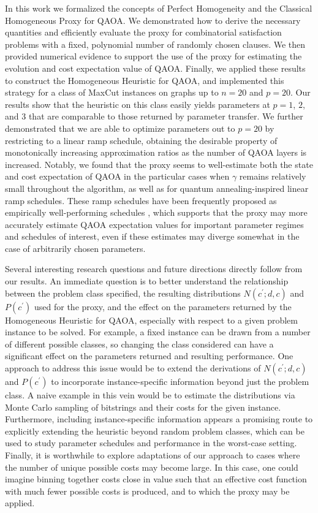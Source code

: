 \documentclass[superscriptaddress,pra,aps,10pt,longbibliography,notitlepage]{revtex4-1}
\newcommand*\cp{c^\prime}
\begin{document}
In this work we formalized the concepts of Perfect Homogeneity and the Classical Homogeneous Proxy for QAOA. We demonstrated how to derive the necessary quantities and efficiently evaluate the proxy for combinatorial satisfaction problems with a fixed, polynomial number of randomly chosen clauses. We then provided numerical evidence to support the use of the proxy for estimating the evolution and cost expectation value of QAOA. Finally, we applied these results to construct the Homogeneous Heuristic for QAOA, and implemented this strategy for a class of MaxCut instances on graphs up to $n=20$ and $p=20$. Our results show that the heuristic on this class easily yields parameters at $p=1$, $2$, and $3$ that are comparable to those returned by parameter transfer. We further demonstrated that we are able to optimize parameters out to $p=20$ by restricting to a linear ramp schedule, obtaining the desirable property of monotonically increasing approximation ratios as the number of QAOA layers is increased. Notably, we found that the proxy seems to well-estimate both the state and cost expectation of QAOA in the particular cases when $\gamma$ remains relatively small throughout the algorithm, as well as for quantum annealing-inspired linear ramp schedules. These ramp schedules have been frequently proposed as empirically well-performing schedules \cite{zhou20,lotshaw21,wurtz21_counteradiabaticity}, which supports that the proxy may more accurately estimate QAOA expectation values for important parameter regimes and schedules of interest, even if these estimates may diverge somewhat in the 
case of arbitrarily chosen parameters. 

Several interesting research questions and future directions directly follow from our results. An immediate question is to better understand the relationship between the problem class specified, the resulting distributions $N(\cp;d,c)$ and $P(\cp)$ used for the proxy, and the effect on the parameters returned by the Homogeneous Heuristic for QAOA, especially with respect to a given problem instance to be solved. For example, a fixed instance can be drawn from a number of different possible classes, so changing the class considered can have a significant effect on the parameters returned and resulting performance. One approach to address this issue would be to extend the derivations of $N(\cp;d,c)$ and $P(\cp)$ to incorporate instance-specific information beyond just the problem class. A naive example in this vein would be to estimate the distributions via Monte Carlo sampling of bitstrings and their costs for the given instance. Furthermore, including instance-specific information appears a promising route to explicitly extending the heuristic beyond random problem classes, which can be used to study parameter schedules and performance in the worst-case setting. Finally, it is worthwhile to explore adaptations of our approach to cases where the number of unique possible costs may become large. In this case, one could imagine binning together costs close in value such that an effective cost function with much fewer possible costs is produced, and to which the proxy may be applied.
\end{document}
